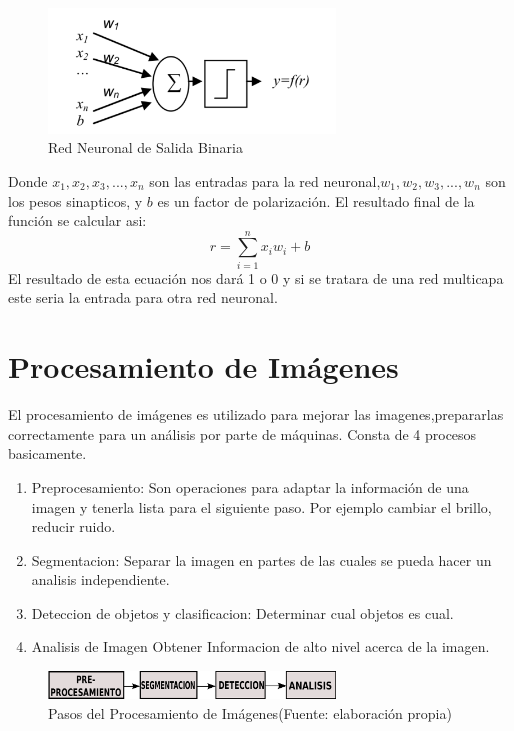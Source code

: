  \begin{figure}
\centering
\includegraphics[width=3.0in]{imagen4.pdf}

\caption{Red Neuronal de Salida Binaria}
\label{fig_mar}
\end{figure}
Donde $x_1,x_2,x_3,...,x_n$ son las entradas para la red neuronal,$w_1,w_2,w_3,...,w_n$  son los pesos sinapticos, y $b$ es un factor de polarizaci\'on. El resultado final de la funci\'on se calcular asi: 
\begin{equation}
r= \sum_{i=1}^{n}x_iw_i+b
\end{equation}
El resultado de esta ecuaci\'on  nos dar\'a 1 o 0 y si se tratara de una red multicapa este seria la entrada para otra red neuronal.\cite{art_red1}

 \section{Procesamiento de Im\'agenes}
El procesamiento de im\'agenes es utilizado para mejorar las imagenes,prepararlas correctamente para un an\'alisis por parte de m\'aquinas. Consta de 4 procesos basicamente.\cite{art_red1}
\begin{enumerate}
\item Preprocesamiento: Son operaciones para adaptar la informaci\'on de una imagen y tenerla lista para el siguiente paso. Por ejemplo cambiar el brillo, reducir ruido.
\item Segmentacion: Separar la imagen en partes de las cuales se pueda hacer un analisis independiente.
\item Deteccion de objetos y clasificacion: Determinar cual objetos es cual.
\item Analisis de Imagen Obtener Informacion de alto nivel acerca de la imagen.
\end{enumerate}
 \begin{figure}
	\centering
	\includegraphics[width=3.0in]{imagen5.pdf}
	\caption{Pasos del Procesamiento de Im\'agenes(Fuente: elaboraci\'on propia)}
	
\end{figure}
